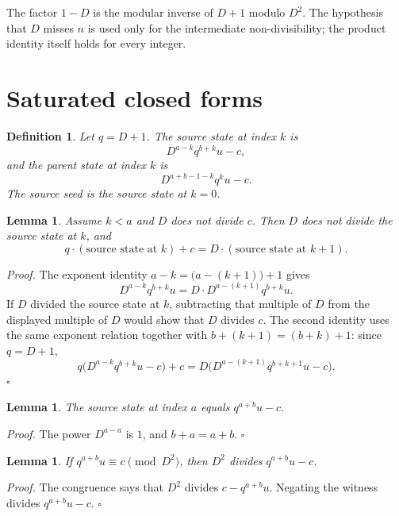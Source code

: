\documentclass[11pt,letterpaper]{article}
\newtheorem{lemma}[theorem]{Lemma}
\newtheorem{definition}[theorem]{Definition}
\newenvironment{proof}{\noindent\textit{Proof.}}{\hfill\(\square\)}
\begin{document}
The factor \(1-D\) is the modular inverse of \(D+1\) modulo \(D^2\). The hypothesis that \(D\) misses \(n\) is used only for the intermediate non-divisibility; the product identity itself holds for every integer.

\section{Saturated closed forms}

\begin{definition}
\label{def:saturated-states}
Let \(q=D+1\). The \emph{source state} at index \(k\) is
\[
D^{a-k}q^{b+k}u-c,
\]
and the \emph{parent state} at index \(k\) is
\[
D^{a+b-1-k}q^{k}u-c.
\]
The \emph{source seed} is the source state at \(k=0\).
\end{definition}

\begin{lemma}
\label{lem:source-step}
Assume \(k<a\) and \(D\) does not divide \(c\). Then \(D\) does not divide the source state at \(k\), and
\[
q\cdot(\text{source state at \(k\)})+c
=D\cdot(\text{source state at \(k+1\)}).
\]
\end{lemma}

\begin{proof}
The exponent identity \(a-k=\bigl(a-(k+1)\bigr)+1\) gives
\[
D^{a-k}q^{b+k}u
=D\cdot D^{a-(k+1)}q^{b+k}u.
\]
If \(D\) divided the source state at \(k\), subtracting that multiple of \(D\) from the displayed multiple of \(D\) would show that \(D\) divides \(c\). The second identity uses the same exponent relation together with \(b+(k+1)=(b+k)+1\): since \(q=D+1\),
\[
q\bigl(D^{a-k}q^{b+k}u-c\bigr)+c
=D\bigl(D^{a-(k+1)}q^{b+k+1}u-c\bigr).
\]
\end{proof}

\begin{lemma}
\label{lem:source-terminal}
The source state at index \(a\) equals \(q^{a+b}u-c\).
\end{lemma}

\begin{proof}
The power \(D^{a-a}\) is \(1\), and \(b+a=a+b\).
\end{proof}

\begin{lemma}
\label{lem:congruence-divides}
If \(q^{a+b}u\equiv c\pmod{D^2}\), then \(D^2\) divides \(q^{a+b}u-c\).
\end{lemma}

\begin{proof}
The congruence says that \(D^2\) divides \(c-q^{a+b}u\). Negating the witness divides \(q^{a+b}u-c\).
\end{proof}
\end{document}
